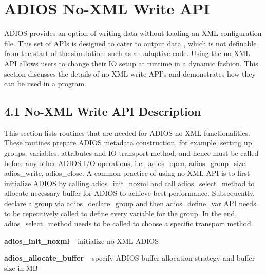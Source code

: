 \vspace{22pt}
\section{ADIOS No-XML Write API }

\vspace{24pt}
\leftskip=0pt
ADIOS provides an option of writing data without loading an XML configuration file. 
This set of APIs is designed to cater to output data , which is not definable from 
the start of the simulation; such as an adaptive code. Using the no-XML API allows 
users to change their IO setup at runtime in a dynamic fashion.  This section discusses 
the details of no-XML write API's and demonstrates how they can be used in a program. 
 \label{HToc182553355}

\vspace{24pt}
\subsection*{{\large 4.1 }{\large \textbf{No-XML Write API Description}}}

\vspace{10pt}
This section lists routines that are needed for ADIOS no-XML functionalities. These 
routines prepare ADIOS metadata construction, for example, setting up groups, variables, 
attributes and IO transport method, and hence must be called before any other ADIOS 
I/O operations, i.e., adios\_open, adios\_group\_size, adios\_write, adios\_close. 
A common practice of using no-XML API is to first initialize ADIOS by calling adios\_init\_noxml 
and call adios\_select\_method to allocate necessary buffer for ADIOS to achieve 
best performance. Subsequently, declare a group via adios\_declare\_group and then 
adios\_define\_var API needs to be repetitively called to define every variable 
for the group.  In the end, adios\_select\_method needs to be called to choose 
a specific transport method.

\vspace{10pt}
\textbf{adios\_init\_noxml---}initialize no-XML ADIOS

\vspace{10pt}
\textbf{adios\_allocate\_buffer---}specify ADIOS buffer allocation strategy and 
buffer size in MB

